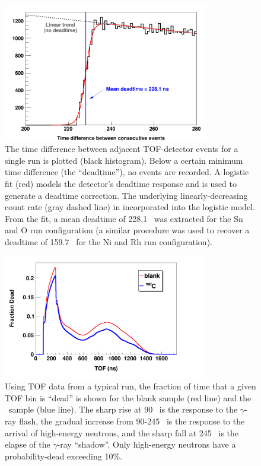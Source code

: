 \begin{figure}[tb]
    \centering
    \includegraphics[width=0.8\textwidth]{figures/TimeDifferenceBetweenEvents.png}
    \caption[The time difference between consecutive events in the time-of-flight detector]
    {The time difference between adjacent TOF-detector
    events for a single run is plotted (black histogram). Below a certain
minimum time difference (the ``deadtime''), no events are recorded. A logistic
fit (red) models the detector's deadtime response and is used to generate a
deadtime correction. The underlying linearly-decreasing count rate (gray dashed
line) in incorporated into the logistic model. From the fit, a mean deadtime of
228.1 \nano\second\ was extracted for the Sn and O run configuration (a similar
procedure was used to recover a deadtime of 159.7 \nano\second\ for the Ni and Rh
run configuration).}
    \label{TimeDifferenceBetweenEvents}
\end{figure}

\begin{figure}[tb]
    \centering
    \includegraphics[width=0.8\textwidth]{figures/exampleDeadtimeSpectrum.png}
    \caption[Digitizer busy probability as a function of time within micropulse]
    {
        Using TOF data from a typical run, the fraction of time that a given 
        TOF bin is ``dead'' is shown for the blank sample (red line) and the 
        \cNat\ sample (blue line). The sharp rise at 90 \nano\second\ is the response to the
        $\gamma$-ray flash, the gradual increase from 90-245 \nano\second\ is the response to
        the arrival of high-energy neutrons, and the sharp fall at 245
        \nano\second\ is the elapse of the $\gamma$-ray ``shadow''.
        Only high-energy neutrons have a probability-dead exceeding 10\%.
    }
    \label{ExampleDeadtimeSpectrum}
\end{figure}

